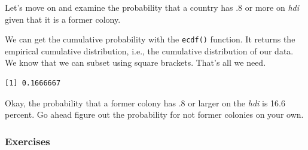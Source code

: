 \documentclass[]{article}
\newenvironment{Shaded}{\begin{snugshade}}{\end{snugshade}}
\newcommand{\KeywordTok}[1]{\textcolor[rgb]{0.13,0.29,0.53}{\textbf{#1}}}
\newcommand{\DecValTok}[1]{\textcolor[rgb]{0.00,0.00,0.81}{#1}}
\newcommand{\StringTok}[1]{\textcolor[rgb]{0.31,0.60,0.02}{#1}}
\newcommand{\OperatorTok}[1]{\textcolor[rgb]{0.81,0.36,0.00}{\textbf{#1}}}
\newcommand{\NormalTok}[1]{#1}
\theoremstyle{definition}
\theoremstyle{definition}
\theoremstyle{definition}
\theoremstyle{remark}
\begin{document}
Let's move on and examine the probability that a country has .8 or more
on \emph{hdi} given that it is a former colony.

We can get the cumulative probability with the \texttt{ecdf()} function.
It returns the empirical cumulative distribution, i.e., the cumulative
distribution of our data. We know that we can subset using square
brackets. That's all we need.

\begin{Shaded}
\end{Shaded}

\begin{verbatim}
[1] 0.1666667
\end{verbatim}

Okay, the probability that a former colony has .8 or larger on the
\emph{hdi} is 16.6 percent. Go ahead figure out the probability for not
former colonies on your own.

\subsubsection{Exercises}\label{exercises-2}
\end{document}
